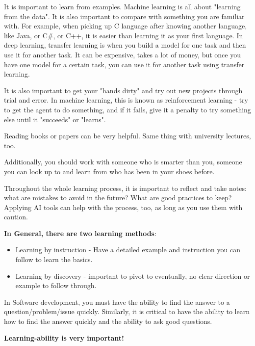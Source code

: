 {It is important to learn from examples. Machine learning is all about "learning from the data". It is also important to compare with something you are familiar with. For example, when picking up C language after knowing another language, like Java, or C\#, or C++, it is easier than learning it as your first language. In deep learning, transfer learning is when you build a model for one task and then use it for another task. It can be expensive, takes a lot of money, but once you have one model for a certain task, you can use it for another task using transfer learning.

It is also important to get your "hands dirty" and try out new projects through trial and error. In machine learning, this is known as reinforcement learning - try to get the agent to do something, and if it fails, give it a penalty to try something else until it "succeeds" or "learns".

Reading books or papers can be very helpful. Same thing with university lectures, too. 

Additionally, you should work with someone who is smarter than you, someone you can look up to and learn from who has been in your shoes before. 

Throughout the whole learning process, it is important to reflect and take notes: what are mistakes to avoid in the future? What are good practices to keep? Applying AI tools can help with the process, too, as long as you use them with caution.

\vspace{11pt}
\textbf{In General, there are two learning methods}:
\begin{itemize}
    \item Learning by instruction - Have a detailed example and instruction you can follow to learn the basics.
    \item Learning by discovery - important to pivot to eventually, no clear direction or example to follow through.
\end{itemize}
\vspace{11pt}

In Software development, you must have the ability to find the answer to a question/problem/issue quickly. Similarly, it is critical to have the ability to learn how to find the answer quickly and the ability to ask good questions.

\vspace{11pt}
\textbf{Learning-ability is very important!}
\vspace{11pt}

}
